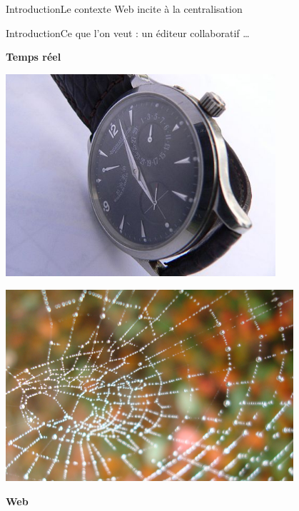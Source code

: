 \begin{frame}{Introduction}{Le contexte Web incite à la centralisation}

\end{frame}


\begin{frame}{Introduction}{Ce que l'on veut : un éditeur collaboratif \ldots}
  
  \begin{minipage}{0.45\textwidth}
    \hfill \YES{\cmark} \textbf{Temps réel}
  \end{minipage}
  \begin{minipage}{0.45\textwidth}
    \includegraphics[width=0.75\textwidth]{img/watch.jpg}
  \end{minipage}
    
  \vspace{-0.75cm}

  \begin{minipage}{0.45\textwidth}
    \hfill  \includegraphics[width=0.8\textwidth]{img/toile.jpg}
  \end{minipage}  
  \begin{minipage}{0.45\textwidth}
    \textbf{Web} \YES{\cmark}
  \end{minipage}
  

\end{frame}
